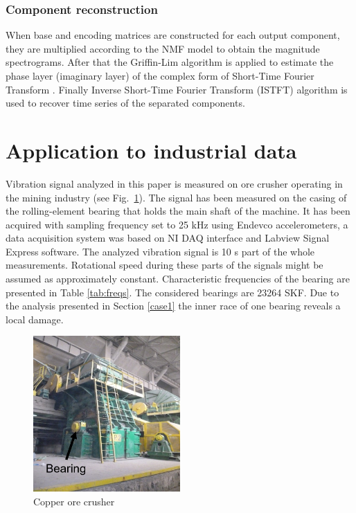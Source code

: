 \documentclass[3p,times]{elsarticle}
\begin{document}
\subsubsection{Component reconstruction}

When base and encoding matrices are constructed for each output component, they are multiplied according to the NMF model to obtain the magnitude spectrograms. After that the Griffin-Lim algorithm is applied to estimate the phase layer (imaginary layer) of the complex form of Short-Time Fourier Transform \cite{griffin1984signal}. Finally Inverse Short-Time Fourier Transform (ISTFT) algorithm is used to recover time series of the separated components.

\section{Application to industrial data}

Vibration signal analyzed in this paper is measured on ore crusher operating in the mining industry (see Fig.~\ref{fig:obj_crush}). The signal has been measured on the casing of the rolling-element bearing that holds the main shaft of the machine. It has been acquired with sampling frequency set to 25 kHz using Endevco accelerometers, a data acquisition system was based on NI DAQ interface and Labview Signal Express software. The analyzed vibration signal is 10 s part of the whole measurements. Rotational speed during these parts of the signals might be assumed as approximately constant. Characteristic frequencies of the bearing are presented in Table \ref{tab:freqs}. The considered bearings are 23264 SKF. Due to the analysis presented in Section \ref{case1} the inner race of one bearing reveals a local damage. 

\begin{figure}[ht!]
\centering
\includegraphics[width=0.5\textwidth]{figs/obj_crush.png}
\caption{Copper ore crusher}
\label{fig:obj_crush}
\end{figure}
\end{document}
